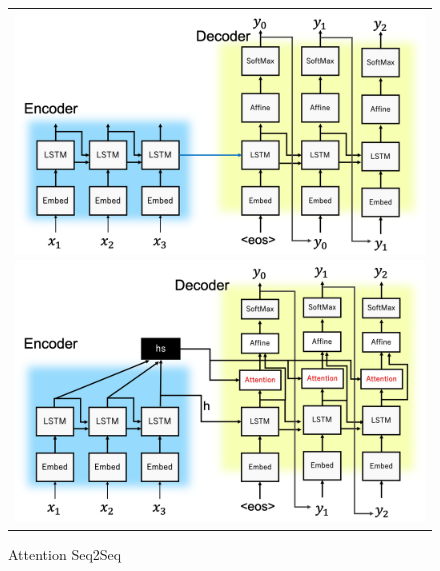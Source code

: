 \documentclass[a4j,11pt,report]{jsbook}
\begin{document}
\begin{figure}[htpb]
  \centering
  \begin{tabular}{c}

    \begin{minipage}{0.47\hsize}
      \centering
      \includegraphics[width=\linewidth]{image/seq2seq_image.png}
      \caption{Seq2Seq}
      \label{fig:seq2seq}
    \end{minipage}


    \begin{minipage}{0.06\hsize}
      \hspace{2mm}
    \end{minipage}


    \begin{minipage}{0.47\hsize}
      \centering
      \includegraphics[width=\linewidth]{image/attention_image.png}
      \caption{Attention Seq2Seq}
      \label{fig:Attention Seq2Seq}
    \end{minipage}

  \end{tabular}
\end{figure}
\end{document}
